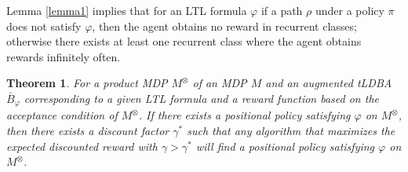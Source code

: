 \documentclass[letterpaper, 10 pt, conference]{ieeeconf}  %
\newtheorem{theorem}{Theorem}
\newtheorem{lemma}{Lemma}
\begin{document}
Lemma \ref{lemma1} implies that for an LTL formula $\varphi$ if a path $\rho$ under a policy $\pi$ does not satisfy $\varphi$, then the agent obtains no reward in recurrent classes; otherwise there exists at least one recurrent class where the agent obtains rewards infinitely often.

\begin{theorem}
  For a product MDP $M^{\otimes}$ of an MDP $M$ and an augmented tLDBA $\bar{B}_{\varphi}$ corresponding to a given LTL formula and a reward function based on the acceptance condition of $M^{\otimes}$. If there exists a positional policy satisfying $\varphi$ on $M^{\otimes}$, then there exists a discount factor $\gamma^{\ast}$ such that any algorithm that maximizes the expected discounted reward with $\gamma > \gamma^{\ast}$ will find a positional policy satisfying $\varphi$ on $M^{\otimes}$.
  \label{theorem1}
\end{theorem}
\end{document}
